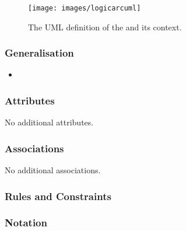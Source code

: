 \begin{figure}[htb]
  \centering
  \texttt{[image: images/logicarcuml]}
  \caption{The UML definition of the  and its context.}
  \label{fig:techref:logicarcuml}
\end{figure}

\subsubsection{Generalisation}

\begin{itemize}
\item {}
\end{itemize}

\subsubsection{Attributes}

No additional attributes.

\subsubsection{Associations}

No additional associations.

\subsubsection{Rules and Constraints}

\begin{valrules}
\end{valrules}


\subsubsection{Notation}

